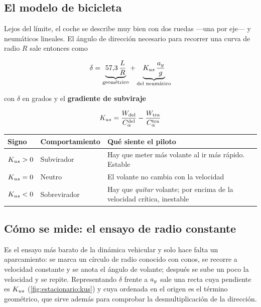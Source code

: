 \subsection{El modelo de bicicleta}

Lejos del límite, el coche se describe muy bien con dos ruedas ---una por
eje--- y neumáticos lineales. El ángulo de dirección necesario para recorrer
una curva de radio $R$ sale entonces como

\begin{equation}
  \delta = \underbrace{57{,}3\,\frac{L}{R}}_{\text{geométrico}}
         + \underbrace{K_{us}\,\frac{a_y}{g}}_{\text{del neumático}}
  \label{eq:angulo_direccion}
\end{equation}

con $\delta$ en grados y el \textbf{gradiente de subviraje}

\begin{equation}
  K_{us} = \frac{W_{\text{del}}}{C_{\alpha}^{\text{del}}}
       - \frac{W_{\text{tra}}}{C_{\alpha}^{\text{tra}}}
  \label{eq:kus}
\end{equation}

\begin{center}
\begin{tabularx}{\textwidth}{@{}lXX@{}}
\toprule
\textbf{Signo} & \textbf{Comportamiento} & \textbf{Qué siente el piloto} \\
\midrule
$K_{us} > 0$ & Subvirador & Hay que meter más volante al ir más rápido. Estable \\
$K_{us} = 0$ & Neutro & El volante no cambia con la velocidad \\
$K_{us} < 0$ & Sobrevirador & Hay que \emph{quitar} volante; por encima de la velocidad crítica, inestable \\
\bottomrule
\end{tabularx}
\end{center}

\subsection{Cómo se mide: el ensayo de radio constante}

Es el ensayo más barato de la dinámica vehicular y solo hace falta un
aparcamiento: se marca un círculo de radio conocido con conos, se recorre a
velocidad constante y se anota el ángulo de volante; después se sube un poco la
velocidad y se repite. Representando $\delta$ frente a $a_y$ sale una recta
cuya pendiente es $K_{us}$ (\cref{fig:estacionario:kus}) y cuya ordenada en el
origen es el término geométrico, que sirve además para comprobar la
desmultiplicación de la dirección.

